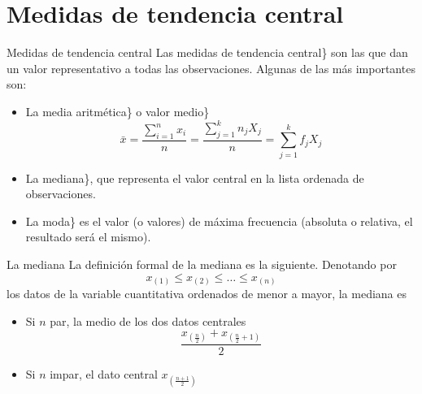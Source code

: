 \documentclass[
  ignorenonframetext,
]{beamer}
\providecommand{\tightlist}{%
  \setlength{\itemsep}{0pt}\setlength{\parskip}{0pt}}
\begin{document}
\section{Medidas de tendencia
central}\label{medidas-de-tendencia-central}

\begin{frame}{Medidas de tendencia central}
\label{medidas-de-tendencia-central-1}
Las medidas de tendencia central\} son las que dan un valor
representativo a todas las observaciones. Algunas de las más importantes
son:

\begin{itemize}
\tightlist
\item
  La media aritmética\} o valor medio\}
  \[\bar{x} = \frac{\sum_{i=1}^nx_i}{n}=\frac{\sum_{j=1}^kn_jX_j}{n}=\sum_{j=1}^kf_jX_j\]
\item
  La mediana\}, que representa el valor central en la lista ordenada de
  observaciones.
\item
  La moda\} es el valor (o valores) de máxima frecuencia (absoluta o
  relativa, el resultado será el mismo).
\end{itemize}
\end{frame}

\begin{frame}{La mediana}
\label{la-mediana}
La definición formal de la mediana es la siguiente. Denotando por
\[x_{(1)}\le x_{(2)}\le\dots\le x_{(n)}\] los datos de la variable
cuantitativa ordenados de menor a mayor, la mediana es

\begin{itemize}
\tightlist
\item
  Si \(n\) par, la medio de los dos datos centrales
  \[\frac{x_{(\frac{n}{2})}+x_{(\frac{n}{2}+1)}}{2}\]
\item
  Si \(n\) impar, el dato central \(x_{(\frac{n+1}{2})}\)
\end{itemize}
\end{frame}
\end{document}
